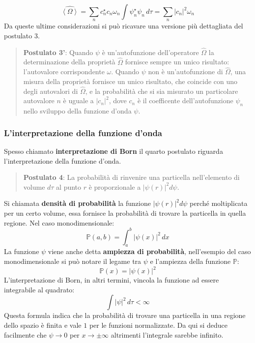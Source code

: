 $$\hat{\left \langle \Omega \right \rangle} = \sum_{n} c_n^{\star} c_n \omega_n \int \psi_n^{\star} \psi_n \, d\tau = \sum_n {\left| c_n \right|}^2 \omega_n$$
Da queste ultime considerazioni si può ricavare una versione più dettagliata del postulato 3.
\begin{quote}
  \textbf{Postulato 3'}: Quando $\psi$ è un'autofunzione dell'operatore $\hat{\Omega}$ la determinazione della proprietà $\hat{\Omega}$ fornisce sempre un unico risultato: l'autovalore corrispondente $\omega$. Quando $\psi$ non è un'autofunzione di $\hat{\Omega}$, una misura della proprietà fornisce un unico risultato, che coincide con uno degli autovalori di $\hat{\Omega}$, e la probabilità che si sia misurato un particolare autovalore $n$ è uguale a ${\left|c_n\right|}^2$, dove $c_n$ è il coefficente dell'autofunzione $\psi_n$ nello sviluppo della funzione d'onda $\psi$.
\end{quote}

\subsubsection{L'interpretazione della funzione d'onda}
Spesso chiamato \textbf{interpretazione di Born} il quarto postulato riguarda l'interpretazione della funzione d'onda.
\begin{quote}
  \textbf{Postulato 4}: La probabilità di rinvenire una particella nell'elemento di volume $d\tau$ al punto $r$ è proporzionale a ${\left|\psi(r)\right|}^2 d\psi$.
\end{quote}
Si chiamata \textbf{densità di probabilità} la funzione ${\left|\psi(r)\right|}^2 d\psi$ perché moltiplicata per un certo volume, essa fornisce la probabilità di trovare la particella in quella regione. Nel caso monodimensionale:
$$\mathbb{P}(a, b) = \int_a^b {\left|\psi(x)\right|}^2 \, dx$$
La funzione $\psi$ viene anche detta \textbf{ampiezza di probabilità}, nell'esempio del caso monodimensionale si può notare il legame tra $\psi$ e l'ampiezza della funzione $\mathbb{P}$:
$$\mathbb{P}(x) = {\left|\psi(x)\right|}^2$$
L'interpretazione di Born, in altri termini, vincola la funzione ad essere integrabile al quadrato:
$$\int {\left|\psi\right|}^2 \, d\tau < \infty$$
Questa formula indica che la probabilità di trovare una particella in una regione dello spazio è finita e vale $1$ per le funzioni normalizzate. Da qui si deduce facilmente che $\psi \to 0$ per $ x \to \pm \infty$ altrimenti l'integrale sarebbe infinito.

